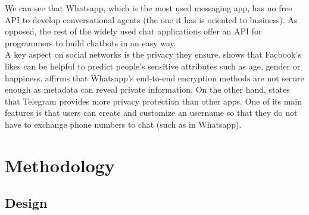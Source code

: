 \documentclass[12pt,english]{article}
\begin{document}
We can see that Whatsapp, which is the most used messaging app, has no free API to develop conversational agents (the one it has is oriented to business). As opposed, the rest of the widely used chat applications offer an API for programmers to build chatbots in an easy way. \\

A key aspect on social networks is the privacy they ensure. \cite{Kosinski5802} shows that Facbook's likes can be helpful to predict people's sensitive attributes such as age, gender or happiness. \cite{Rastogi17} affirms that Whatsapp's end-to-end encryption methods are not secure enough as metadata can reveal private information. On the other hand, \cite{Sutikno16} states that Telegram provides more privacy protection than other apps. One of its main features is that users can create and customize an username so that they do not have to exchange phone numbers to chat (such as in Whatsapp).


\newpage

\section{Methodology}

\subsection{Design}
\end{document}
